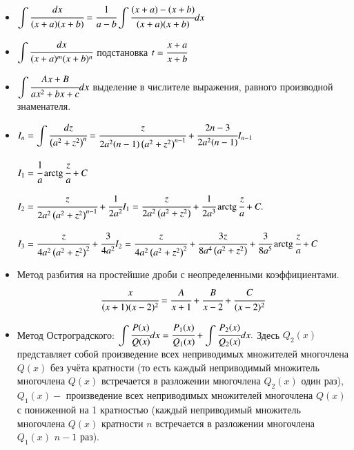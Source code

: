 \documentclass[twoside, a4paperpt, fleqn]{extarticle}
\begin{document}
\begin{itemize}
    \item $ \displaystyle \int \cfrac{d x}{(x+a)(x+b)}=\cfrac{1}{a-b} \displaystyle \int \cfrac{(x+a)-(x+b)}{(x+a)(x+b)} d x $
    \item $ \displaystyle \int \cfrac{d x}{(x+a)^{m}(x+b)^{n}}$ подстановка $ t=\cfrac{x+a}{x+b} $
    \item $ \displaystyle \int \cfrac{A x+B}{a x^{2}+b x+c} d x$ выделение в числителе выражения,  равного производной знаменателя.
    \item $I_{n}=\displaystyle \int \cfrac{d z}{\left(a^{2}+z^{2}\right)^{n}} = \cfrac{z}{2 a^{2}(n-1)\left(a^{2}+z^{2}\right)^{n-1}}+\cfrac{2 n-3}{2 a^{2}(n-1)} I_{n-1}$
    
    $I_{1}=\cfrac{1}{a} \operatorname{arctg} \cfrac{z}{a}+C$
    
    $I_{2}=\cfrac{z}{2 a^{2}\left(a^{2}+z^{2}\right)^{n-1}}+\cfrac{1}{2 a^{2}} I_{1}=\cfrac{z}{2 a^{2}\left(a^{2}+z^{2}\right)}+\cfrac{1}{2 a^{3}} \operatorname{arctg} \cfrac{z}{a}+C .$
    
    $I_{3}=\cfrac{z}{4 a^{2}\left(a^{2}+z^{2}\right)^{2}}+\cfrac{3}{4 a^{2}} I_{2}=\cfrac{z}{4 a^{2}\left(a^{2}+z^{2}\right)^{2}}+\cfrac{3 z}{8 a^{4}\left(a^{2}+z^{2}\right)}+\cfrac{3}{8 a^{5}} \operatorname{arctg} \cfrac{z}{a}+C$

    \item Метод разбития на простейшие дроби с неопределенными коэффициентами.
    $$\cfrac{x}{(x+1)(x-2)^{2}}=\cfrac{A}{x+1}+\cfrac{B}{x-2}+\cfrac{C}{(x-2)^{2}}$$
    \newpage
    \item Метод Остроградского: $\displaystyle \int \cfrac{P(x)}{Q(x)} d x=\cfrac{P_{1}(x)}{Q_{1}(x)}+\displaystyle \int \cfrac{P_{2}(x)}{Q_{2}(x)} d x .$
    Здесь $Q_{2}(x)$ представляет собой произведение всех неприводимых множителей многочлена $Q(x)$ без учёта кратности (то есть каждый неприводимый множитель многочлена $Q(x)$ встречается в разложении многочлена $Q_{2}(x)$ один раз), $Q_{1}(x)-$ произведение всех неприводимых множителей многочлена $Q(x)$ с пониженной на 1 кратностью (каждый неприводимый множитель многочлена $Q(x)$ кратности $n$ встречается в разложении многочлена $Q_{1}(x)$ $n-1$ раз).
\end{itemize}
\end{document}
